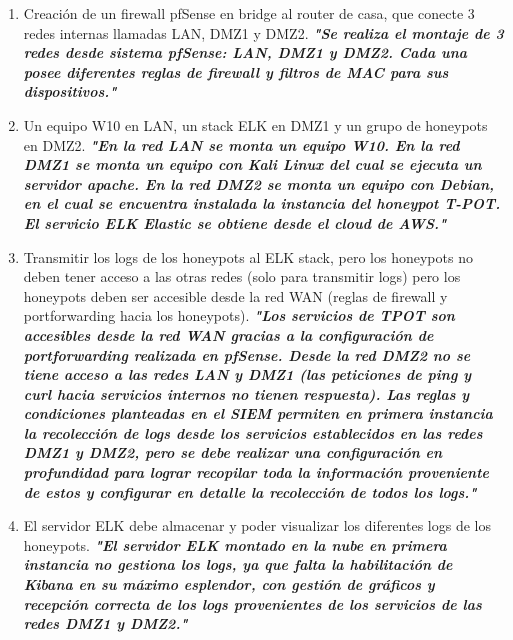 \documentclass[12pt,oneside,a4paper]{book}
\begin{document}
\begin{enumerate}
    \item Creación de un firewall pfSense en bridge al router de casa, que conecte 3 redes internas llamadas LAN, DMZ1 y DMZ2.
    \newline
    \newline
    \textbf{\textit{"Se realiza el montaje de 3 redes desde sistema pfSense: LAN, DMZ1 y DMZ2. Cada una posee diferentes reglas de firewall y filtros de MAC para sus dispositivos."}}
    \newline
    \item Un equipo W10 en LAN, un stack ELK en DMZ1 y un grupo de honeypots en DMZ2.
    \newline
    \newline
    \textbf{\textit{"En la red LAN se monta un equipo W10. En la red DMZ1 se monta un equipo con Kali Linux del cual se ejecuta un servidor apache. En la red DMZ2 se monta un equipo con Debian, en el cual se encuentra instalada la instancia del honeypot T-POT. El servicio ELK Elastic se obtiene desde el cloud de AWS."}}
    \newline
    \item Transmitir los logs de los honeypots al ELK stack, pero los honeypots no deben tener acceso a las otras redes (solo para transmitir logs) pero los honeypots deben ser accesible desde la red WAN (reglas de firewall y portforwarding hacia los honeypots).
    \newline
    \newline
    \textbf{\textit{"Los servicios de TPOT son accesibles desde la red WAN gracias a la configuración de portforwarding realizada en pfSense. Desde la red DMZ2 no se tiene acceso a las redes LAN y DMZ1 (las peticiones de ping y curl hacia servicios internos no tienen respuesta). Las reglas y condiciones planteadas en el SIEM permiten en primera instancia la recolección de logs desde los servicios establecidos en las redes DMZ1 y DMZ2, pero se debe realizar una configuración en profundidad para lograr recopilar toda la información proveniente de estos y configurar en detalle la recolección de todos los logs."}}
    \newline
    \item El servidor ELK debe almacenar y poder visualizar los diferentes logs de los honeypots.
    \newline
    \newline
    \textbf{\textit{"El servidor ELK montado en la nube en primera instancia no gestiona los logs, ya que falta la habilitación de Kibana en su máximo esplendor, con gestión de gráficos y recepción correcta de los logs provenientes de los servicios de las redes DMZ1 y DMZ2."}}

\end{enumerate}
\end{document}
